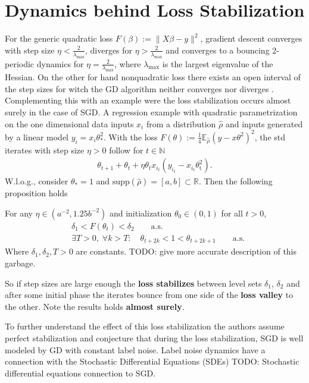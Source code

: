 \section{Dynamics behind Loss Stabilization}
For the generic quadratic loss $F(\beta) := \|X\beta - y\|^{2}$, gradient
descent converges with step size $\eta < \frac{2}{\lambda_{\text{max}}}$,
diverges for $\eta > \frac{2}{\lambda_{\text{max}}}$ and converges to a
bouncing 2-periodic dynamics for $\eta = \frac{2}{\lambda_{\text{max}}}$,
where $\lambda_{\text{max}}$ is the largest eigenvalue of the Hessian. On the
other for hand nonquadratic loss there exists an open interval of the step
sizes for witch the GD algorithm neither converges nor diverges \cite{andriushchenko2023sgd}.
Complementing this with an example were the loss stabilization occurs almost
surely in the case of SGD. A regression example with quadratic
parametrization on the one dimensional data inputs $x_i$ from a distribution
$\hat{\rho}$ and inputs generated by a linear model $y_i =
x_i\theta_{*}^{2}$. With the loss $F(\theta) := \frac{1}{4}
\mathbb{E}_{\hat{\rho}}(y - x\theta^{2})^{2}$, the std iterates with step
size $\eta>0$ follow for $ t \in \mathbb{N}$
\begin{align}
    \theta_{t+1} + \theta_t + \eta \theta_t x_{i_t}(y_{i_t} -
    x_{i_t}\theta_\text{t}^{2}).
\end{align}
W.l.o.g., consider $\theta_* = 1 $ and $\text{supp}(\hat{\rho})=[a,b] \subset
\mathbb{R}$. Then the following proposition holds

\begin{proposition}
    \label{prop: loss-stab}
    For any $\eta \in (a^{-2}, 1.25b^{-2})$ and initialization $\theta_0 \in
    (0, 1)$ for all $t>0$,
    \begin{align}
        &\delta_1 < F(\theta_t) < \delta_2 \qquad \text{a.s.}\\
        &\exists T > 0,\; \forall k > T:\quad \theta_{t+2k}< 1 <
        \theta_{t+2k+1} \qquad \text{a.s.}
    \end{align}
    Where $\delta_1, \delta_2, T>0$ are constants.
    TODO: give more accurate description of this garbage.
\end{proposition}
So if step sizes are large enough the \textbf{loss stabilizes} between level
sets $\delta_1$, $\delta _2$ and after some initial phase the iterates bounce
from one side of the \textbf{loss valley} to the other. Note the results
holds \textbf{almost surely}.

To further understand the effect of this loss stabilization the authors
assume perfect stabilization and conjecture that during the loss
stabilization, SGD is well modeled by GD with constant label noise.
\newline
Label noise dynamics have a connection with the Stochastic Differential
Equations (SDEs)
TODO: Stochastic differential equations connection to SGD.


